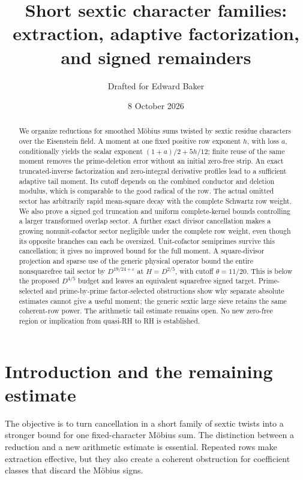 \documentclass[11pt]{article}
\title{Short sextic character families:\\
 extraction, adaptive factorization, and signed remainders}
\author{Drafted for Edward Baker}
\date{8 October 2026}
\numberwithin{equation}{section}
\theoremstyle{definition}
\theoremstyle{remark}
\begin{document}
\maketitle
\begin{abstract}
We organize reductions for smoothed M\"obius sums twisted by sextic
residue characters over the Eisenstein field. A moment at one fixed
positive row exponent \(h\), with loss \(a\), conditionally yields the
scalar exponent \((1+a)/2+5h/12\); finite reuse of the same moment
removes the prime-deletion error without an initial zero-free strip.
An exact truncated-inverse factorization and zero-integral derivative
profiles lead to a sufficient adaptive tail moment. Its cutoff depends
on the combined conductor and deletion modulus, which is comparable
to the good radical of the row. The actual omitted sector has
arbitrarily rapid mean-square decay with the complete Schwartz row
weight. We also prove a signed gcd truncation and uniform complete-kernel
bounds controlling a larger transformed overlap sector.
A further exact divisor cancellation makes a growing nonunit-cofactor
sector negligible under the complete row weight, even though its opposite
branches can each be oversized. Unit-cofactor semiprimes survive this
cancellation; it gives no improved bound for the full moment.
A square-divisor projection and sparse use of the generic physical
operator bound the entire nonsquarefree tail sector by
\(D^{19/24+\varepsilon}\) at \(H=D^{2/5}\), with cutoff
\(\theta=11/20\). This is below the proposed \(D^{4/5}\) budget
and leaves an equivalent squarefree signed target.
Prime-selected and prime-by-prime factor-selected obstructions show
why separate absolute estimates cannot give a useful moment;
the generic sextic large sieve retains the same coherent-row power.
The arithmetic tail estimate remains open. No new zero-free region
or implication from quasi-RH to RH is established.
\end{abstract}
\tableofcontents

\section{Introduction and the remaining estimate}\label{sec:intro}

The objective is to turn cancellation in a short family of sextic
twists into a stronger bound for one fixed-character M\"obius sum.
The distinction between a reduction and a new arithmetic estimate is
essential. Repeated rows make extraction effective, but they also
create a coherent obstruction for coefficient classes that discard
the M\"obius signs.
\end{document}
